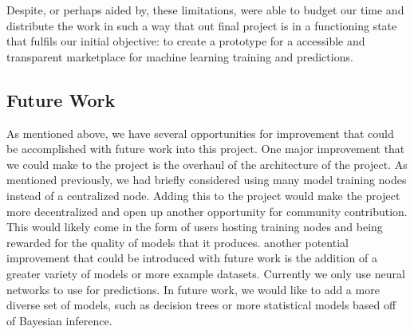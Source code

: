 \documentclass{article}
\begin{document}
    Despite, or perhaps aided by, these limitations, were able to budget our time and distribute the work in such a way
    that out final project is in a functioning state that fulfils our initial objective: to create a prototype for a
    accessible and transparent marketplace for machine learning training and predictions.

    \subsection{Future Work}

    As mentioned above, we have several opportunities for improvement that could be accomplished with future work
    into this project.  One major improvement that we could make to the project is the overhaul of the architecture of
    the project.  As mentioned previously, we had briefly considered using many model training nodes instead of a
    centralized node.  Adding this to the project would make the project more decentralized and open up another opportunity
    for community contribution.  This would likely come in the form of users hosting training nodes and being rewarded for
    the quality of models that it produces.  another potential improvement that could be introduced with future work is
    the addition of a greater variety of models or more example datasets.  Currently we only use neural networks to
    use for predictions.  In future work, we would like to add a more diverse set of models, such as decision trees or
    more statistical models based off of Bayesian inference.

    \pagebreak
    
\end{document}
